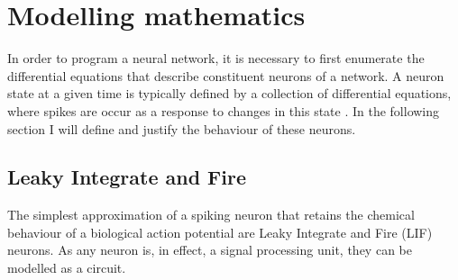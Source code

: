 \section{Modelling mathematics}

In order to program a neural network, it is necessary to first enumerate the
differential equations that describe constituent neurons of a network. A neuron
state at a given time is typically defined by a collection of differential
equations, where spikes are occur as a response to changes in this state \autocite{brette_simulation_2007}. In the
following section I will define and justify the behaviour of these neurons.

\subsection{Leaky Integrate and Fire}

The simplest approximation of a spiking neuron that retains the chemical
behaviour of a biological action potential are Leaky Integrate and Fire (LIF) neurons. As any neuron is, in effect, a
signal processing unit, they can be modelled as a circuit.

